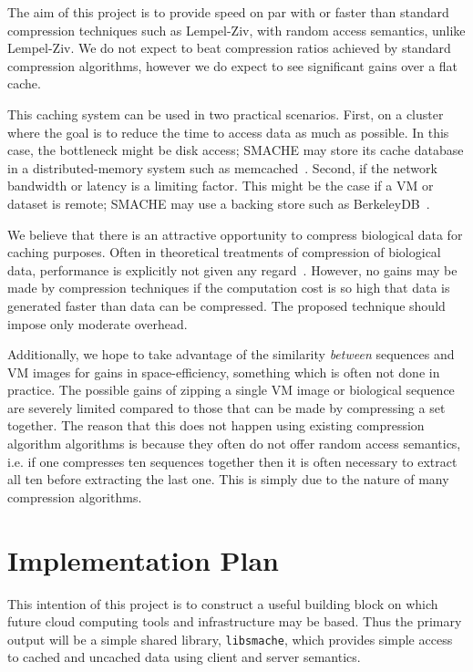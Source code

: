\documentclass{article}[12pt]
\begin{document}
The aim of this project is to provide speed on par with or faster than standard
compression techniques such as Lempel-Ziv, with random access semantics, unlike
Lempel-Ziv.  We do not expect to beat compression ratios achieved by standard
compression algorithms, however we do expect to see significant gains over a
flat cache.

This caching system can be used in two practical scenarios.  First, on a
cluster where the goal is to reduce the time to access data as much as
possible.  In this case, the bottleneck might be disk access; SMACHE may store
its cache database in a distributed-memory system such as
memcached~\cite{memcached}.  Second, if the network bandwidth or latency is a
limiting factor.  This might be the case if a VM or dataset is remote; SMACHE
may use a backing store such as BerkeleyDB~\cite{berkeleydb}.

We believe that there is an attractive opportunity to compress biological data
for caching purposes.  Often in theoretical treatments of compression of
biological data, performance is explicitly not given any
regard~\cite{statistical}.  However, no gains may be made by compression
techniques if the computation cost is so high that data is generated faster
than data can be compressed.  The proposed technique should impose only
moderate overhead.

Additionally, we hope to take advantage of the similarity {\em between}
sequences and VM images for gains in space-efficiency, something which is often
not done in practice.  The possible gains of zipping a single VM image or
biological sequence are severely limited compared to those that can be made by
compressing a set together.  The reason that this does not happen using
existing compression algorithm algorithms is because they often do not offer
random access semantics, i.e. if one compresses ten sequences together then it
is often necessary to extract all ten before extracting the last one.  This is
simply due to the nature of many compression algorithms.

\newpage
\section*{Implementation Plan}

This intention of this project is to construct a useful building block on which
future cloud computing tools and infrastructure may be based.  Thus the primary
output will be a simple shared library, {\tt libsmache}, which provides simple
access to cached and uncached data using client and server semantics.
\end{document}
